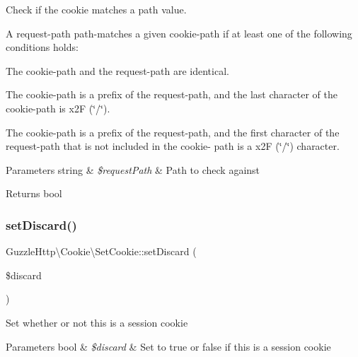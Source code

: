 Check if the cookie matches a path value.

A request-\/path path-\/matches a given cookie-\/path if at least one of the following conditions holds\+:


\begin{DoxyItemize}
\item The cookie-\/path and the request-\/path are identical.
\item The cookie-\/path is a prefix of the request-\/path, and the last character of the cookie-\/path is x2F (\char`\"{}/\char`\"{}).
\item The cookie-\/path is a prefix of the request-\/path, and the first character of the request-\/path that is not included in the cookie-\/ path is a x2F (\char`\"{}/\char`\"{}) character.
\end{DoxyItemize}


\begin{DoxyParams}[1]{Parameters}
string & {\em \$request\+Path} & Path to check against\\
\hline
\end{DoxyParams}
\begin{DoxyReturn}{Returns}
bool 
\end{DoxyReturn}
\mbox{\label{classGuzzleHttp_1_1Cookie_1_1SetCookie_af2bc6875f2bcb84e6faa6f21c0d1b176}} 
\subsubsection{\texorpdfstring{set\+Discard()}{setDiscard()}}
{\footnotesize\ttfamily Guzzle\+Http\textbackslash{}\+Cookie\textbackslash{}\+Set\+Cookie\+::set\+Discard (\begin{DoxyParamCaption}\item[{}]{\$discard }\end{DoxyParamCaption})}

Set whether or not this is a session cookie


\begin{DoxyParams}[1]{Parameters}
bool & {\em \$discard} & Set to true or false if this is a session cookie \\
\hline
\end{DoxyParams}
\mbox{\label{classGuzzleHttp_1_1Cookie_1_1SetCookie_aa9edd4846d58d175f62b5f4edf586452}} 
